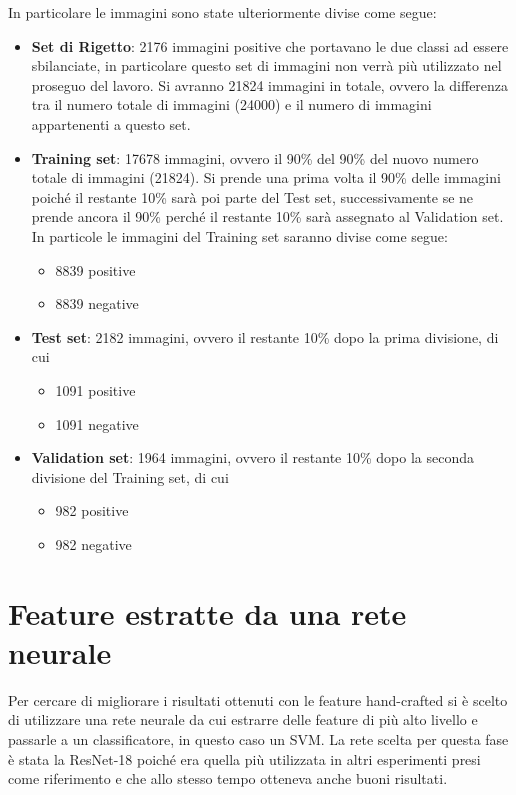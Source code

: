 In particolare le immagini sono state ulteriormente divise come segue:
\begin{itemize}
  \item \textbf{Set di Rigetto}: 2176 immagini positive che portavano le due classi ad essere sbilanciate, in particolare questo set di immagini non verrà più utilizzato nel proseguo del lavoro. Si avranno 21824 immagini in totale, ovvero la differenza tra il numero totale di immagini (24000) e il numero di immagini appartenenti a questo set.
\item \textbf{Training set}: 17678 immagini, ovvero il 90\% del 90\% del nuovo numero totale di immagini (21824). Si prende una prima volta il 90\% delle immagini poiché il restante 10\% sarà poi parte del Test set, successivamente se ne prende ancora il 90\% perché il restante 10\% sarà assegnato al Validation set. In particole le immagini del Training set saranno divise come segue:
  \begin{itemize}
  \item 8839 positive
  \item 8839 negative
  \end{itemize}
  \item \textbf{Test set}: 2182 immagini, ovvero il restante 10\% dopo la prima divisione, di cui
  \begin{itemize}
  \item 1091 positive
  \item 1091 negative
  \end{itemize}
  \item \textbf{Validation set}: 1964 immagini, ovvero il restante 10\% dopo la seconda divisione del Training set, di cui
  \begin{itemize}
  \item 982 positive
  \item 982 negative
  \end{itemize}
\end{itemize}

\section{Feature estratte da una rete neurale}

Per cercare di migliorare i risultati ottenuti con le feature hand-crafted si è scelto di utilizzare una rete neurale da cui estrarre delle feature di più alto livello e passarle a un classificatore, in questo caso un SVM. La rete scelta per questa fase è stata la ResNet-18 poiché era quella più utilizzata in altri esperimenti \cite{sheng2021learning} presi come riferimento e che allo stesso tempo otteneva anche buoni risultati.

